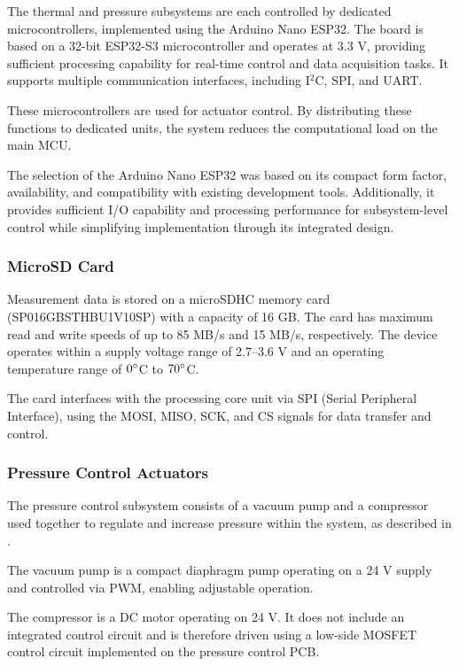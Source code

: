 The thermal and pressure subsystems are each controlled by dedicated microcontrollers, implemented using the Arduino Nano ESP32. The board is based on a 32-bit ESP32-S3 microcontroller and operates at 3.3 V, providing sufficient processing capability for real-time control and data acquisition tasks. It supports multiple communication interfaces, including I$^2$C, SPI, and UART.

These microcontrollers are used for actuator control. By distributing these functions to dedicated units, the system reduces the computational load on the main MCU.

The selection of the Arduino Nano ESP32 was based on its compact form factor, availability, and compatibility with existing development tools. Additionally, it provides sufficient I/O capability and processing performance for subsystem-level control while simplifying implementation through its integrated design.

\subsubsection{MicroSD Card}

Measurement data is stored on a microSDHC memory card (SP016GBSTHBU1V10SP) with a capacity of 16 GB. The card has maximum read and write speeds of up to 85 MB/s and 15 MB/s, respectively. The device operates within a supply voltage range of 2.7--3.6 V and an operating temperature range of $0^\circ$C to $70^\circ$C.

The card interfaces with the processing core unit via SPI (Serial Peripheral Interface), using the MOSI, MISO, SCK, and CS signals for data transfer and control.

\subsubsection{Pressure Control Actuators}

The pressure control subsystem consists of a vacuum pump and a compressor used together to regulate and increase pressure within the system, as described in .

The vacuum pump is a compact diaphragm pump operating on a 24 V supply and controlled via PWM, enabling adjustable operation.

The compressor is a DC motor operating on 24 V. It does not include an integrated control circuit and is therefore driven using a low-side MOSFET control circuit implemented on the pressure control PCB.

